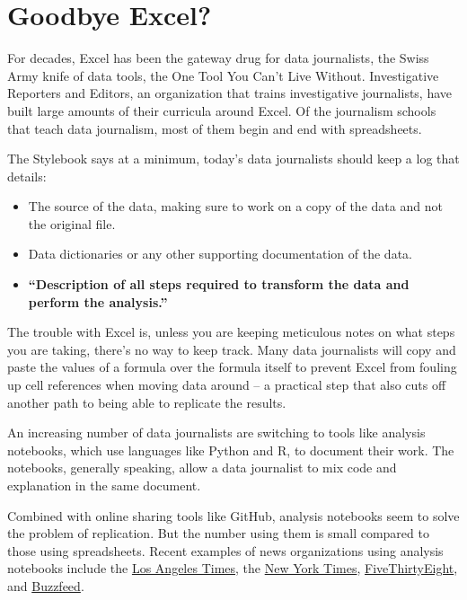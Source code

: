 \documentclass[]{book}
\providecommand{\tightlist}{%
  \setlength{\itemsep}{0pt}\setlength{\parskip}{0pt}}
\begin{document}
\hypertarget{goodbye-excel}{%
\section{Goodbye Excel?}\label{goodbye-excel}}

For decades, Excel has been the gateway drug for data journalists, the Swiss Army knife of data tools, the One Tool You Can't Live Without. Investigative Reporters and Editors, an organization that trains investigative journalists, have built large amounts of their curricula around Excel. Of the journalism schools that teach data journalism, most of them begin and end with spreadsheets.

The Stylebook says at a minimum, today's data journalists should keep a log that details:

\begin{itemize}
\tightlist
\item
  The source of the data, making sure to work on a copy of the data and not the original file.
\item
  Data dictionaries or any other supporting documentation of the data.
\item
  \textbf{``Description of all steps required to transform the data and perform the analysis.''}
\end{itemize}

The trouble with Excel is, unless you are keeping meticulous notes on what steps you are taking, there's no way to keep track. Many data journalists will copy and paste the values of a formula over the formula itself to prevent Excel from fouling up cell references when moving data around -- a practical step that also cuts off another path to being able to replicate the results.

An increasing number of data journalists are switching to tools like analysis notebooks, which use languages like Python and R, to document their work. The notebooks, generally speaking, allow a data journalist to mix code and explanation in the same document.

Combined with online sharing tools like GitHub, analysis notebooks seem to solve the problem of replication. But the number using them is small compared to those using spreadsheets. Recent examples of news organizations using analysis notebooks include the \href{https://github.com/datadesk}{Los Angeles Times}, the \href{https://github.com/TheUpshot}{New York Times}, \href{https://github.com/fivethirtyeight/data}{FiveThirtyEight}, and \href{https://github.com/BuzzFeedNews}{Buzzfeed}.
\end{document}
